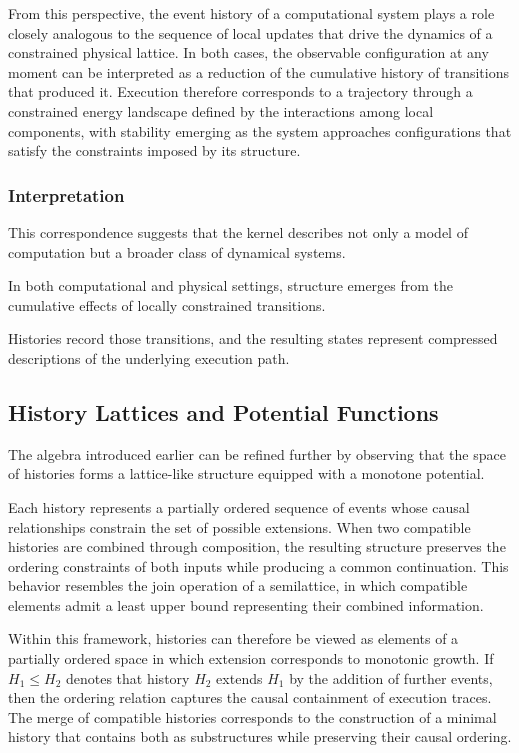 \documentclass[12pt]{article}
\begin{document}
From this perspective, the event history of a
computational system plays a role closely analogous
to the sequence of local updates that drive the
dynamics of a constrained physical lattice. In both
cases, the observable configuration at any moment
can be interpreted as a reduction of the cumulative
history of transitions that produced it. Execution
therefore corresponds to a trajectory through a
constrained energy landscape defined by the
interactions among local components, with stability
emerging as the system approaches configurations
that satisfy the constraints imposed by its
structure.

\subsubsection{Interpretation}

This correspondence suggests that the kernel
describes not only a model of computation but
a broader class of dynamical systems.

In both computational and physical settings,
structure emerges from the cumulative effects
of locally constrained transitions.

Histories record those transitions,
and the resulting states represent compressed
descriptions of the underlying execution path.

\subsection{History Lattices and Potential Functions}

The algebra introduced earlier can be refined further by
observing that the space of histories forms a lattice-like
structure equipped with a monotone potential.

Each history represents a partially ordered sequence of
events whose causal relationships constrain the set of
possible extensions. When two compatible histories are
combined through composition, the resulting structure
preserves the ordering constraints of both inputs while
producing a common continuation. This behavior resembles
the join operation of a semilattice, in which compatible
elements admit a least upper bound representing their
combined information.

Within this framework, histories can therefore be viewed
as elements of a partially ordered space in which extension
corresponds to monotonic growth. If $H_1 \leq H_2$ denotes
that history $H_2$ extends $H_1$ by the addition of further
events, then the ordering relation captures the causal
containment of execution traces. The merge of compatible
histories corresponds to the construction of a minimal
history that contains both as substructures while preserving
their causal ordering.
\end{document}
